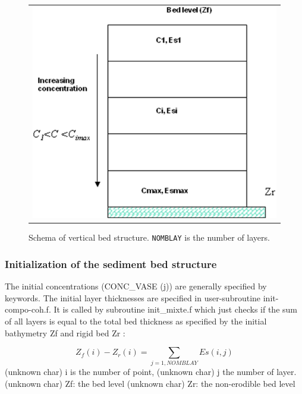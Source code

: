 \begin{figure}[ht]
\label{fig:1}
\begin{center}
\begin{tabular}{c}
\includegraphics[scale=1.0]{graphics/vertical_bed_structure.png} %
\end{tabular}
\caption{Schema of vertical bed structure. \texttt{NOMBLAY} is the number of layers.}
\end{center}
\end{figure}

\subsubsection{Initialization of the sediment bed structure}

The initial concentrations (CONC\_VASE (j)) are generally specified by
keywords.\newline
The initial layer thicknesses are specified in user-subroutine
init-compo-coh.f. It is called by subroutine init\_mixte.f which just checks
if the sum of all layers is equal to the total bed thickness as specified by
the initial bathymetry Zf and rigid bed Zr :

\begin{equation*}
Z_{f} (i)-Z_{r} (i)=\sum\limits_{j=1,NOMBLAY}Es(i,j) 
\end{equation*}%
(unknown char)\hspace{5mm} i is the number of point,\newline
(unknown char)\hspace{5mm} j the number of layer.\newline
(unknown char)\hspace{5mm} Zf: the bed level\newline
(unknown char)\hspace{5mm} Zr: the non-erodible bed level

